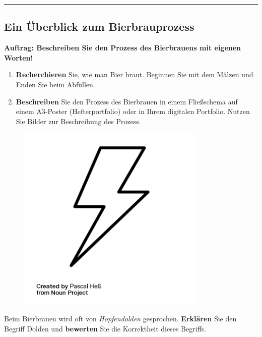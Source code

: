 \documentclass{scrartcl}  %
\begin{document}
		\begin{center}
			\noindent\rule{18cm}{0.1pt}
		\end{center}
			
\newpage
		\subsection{Ein Überblick zum Bierbrauprozess}
		
			\textbf{Auftrag: Beschreiben Sie den Prozess des Bierbrauens mit eigenen Worten!}
			\begin{enumerate}
				\item \textbf{Recherchieren} Sie, wie man Bier braut. Beginnen Sie mit dem Mälzen und Enden Sie beim Abfüllen.
				\item \textbf{Beschreiben} Sie den Prozess des Bierbrauen in einem Fließschema auf einem A3-Poster (Hefterportfolio) oder in Ihrem digitalen Portfolio. Nutzen Sie Bilder zur Beschreibung des Prozess.
			\end{enumerate}
			
			\begin{tcolorbox}[enhanced,
				colback=white,
				colframe=red,
				fonttitle=\sffamily\bfseries\large, 
				title=Für schnelle Schüler\_innen,  %
				attach boxed title to top left={xshift=3.2mm,yshift=-0.40mm},
				boxed title style={skin=enhancedfirst jigsaw,size=small,arc=1mm,bottom=-1mm,colframe=red,height=0.75cm},
				colbacktitle=red,
				drop lifted shadow]
				\begin{figure}  
					\centering
					\vspace{-14pt}  %
					\includegraphics[width=0.8\textwidth]{symbols/symbol_tex_faststudents}
				\end{figure}
				
				Beim Bierbrauen wird oft von \textit{Hopfendolden} gesprochen. \textbf{Erklären} Sie den Begriff Dolden und \textbf{bewerten} Sie die Korrektheit dieses Begriffs.
				\vspace{1.2cm}  %
			\end{tcolorbox}
				
\end{document}
